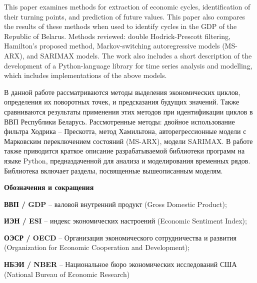 \documentclass[a4paper,14pt]{extreport}
\begin{document}
	\maketitle
	

	\clearpage
	
	\renewcommand{\contentsname}{Содержание}
	\tableofcontents
	
	\clearpage
	
	\bsuabstract
	{
		This paper examines methods for extraction of economic cycles, identification of their turning points, and prediction of future values. This paper also compares the results of these methods when used to identify cycles in the GDP of the Republic of Belarus. Methods reviewed: double Hodrick-Prescott filtering, Hamilton's proposed method,  Markov-switching autoregressive models (MS-ARX), and SARIMAX models. The work also includes a short description of the development of a Python-language library for time series analysis and modelling, which includes implementations of the above models.
		
	}{
		В данной работе рассматриваются методы выделения экономических циклов, определения их поворотных точек, и предсказания будущих значений. Также сравниваются результаты применения этих методов при идентификации циклов в ВВП Республики Беларусь. Рассмотренные методы: двойное использование фильтра Ходрика -- Прескотта, метод Хамильтона, авторегрессионные модели с Марковским переключением состояний (MS-ARX), модели SARIMAX. В работе также приводится краткое описание разрабатываемой библиотеки программ на языке Python, предназдаченной для анализа и моделирования временных рядов. Библиотека включает разделы, посвященные вышеописанным моделям.
	}
	
	\clearpage
	{
		\centering\normalfont\Large\bfseries{Обозначения и сокращения} \par
		\nopagebreak %
	}

	\textbf{ВВП / GDP} -- валовой внутренний продукт (Gross Domestic Product);
	
	\textbf{ИЭН / ESI} -- индекс экономических настроений (Economic Sentiment Index);
	
	\textbf{ОЭСР / OECD} -- Организация экономического сотрудничества и развития (Organization for Economic Cooperation and Development);
	
	\textbf{НБЭИ / NBER} -- Национальное бюро экономических исследований США (National Bureau of Economic Research)
	
\end{document}
